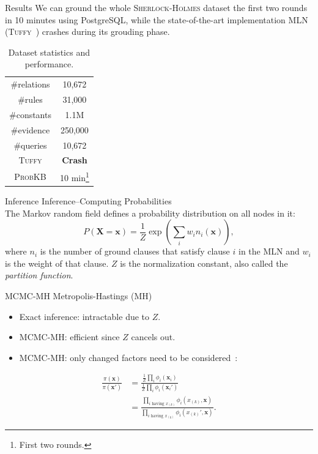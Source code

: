 \documentclass[onlymath,xcolor=pdftex,dvipsnames,table]{beamer}
\newcommand{\probkb}{\textsc{ProbKB}\xspace}
\newcommand{\sherlock}{\textsc{Sherlock}\xspace}
\newcommand{\holmes}{\textsc{Holmes}\xspace}
\newcommand{\tuffy}{\textsc{Tuffy}\xspace}
\let\oldemph\emph
\renewcommand{\emph}[1]{{\color{Blue}\oldemph{#1}}}
\newcommand{\head}[1]{{\large\color{OliveGreen}#1\\[2pt]}}
\begin{document}
\begin{frame}{Results}
We can ground the whole \sherlock-\holmes dataset the first two rounds in 10 minutes using PostgreSQL, while the state-of-the-art implementation MLN (\tuffy~\cite{DBLP:journals/pvldb/NiuRDS11}) crashes during its grouding phase.
\begin{table}
  \centering
  \begin{tabular}{|c|c|}\hline
   \#relations & 10,672 \\
   \#rules     & 31,000 \\
   \#constants & 1.1M \\
   \#evidence  & 250,000 \\
   \#queries   & 10,672 \\
   \tuffy      & \textbf{\color{Red}Crash} \\
   \probkb     & 10 min\footnote{First two rounds.} \\
   \hline
  \end{tabular}
  \caption{Dataset statistics and performance.}
\end{table}
\end{frame}

\begin{frame}{Inference}
\head{Inference--Computing Probabilities}
The Markov random field defines a probability distribution on all nodes in it:
$$P(\mathbf{X}=\mathbf{x})=\frac{1}{Z}\exp\left(\sum_iw_in_i(\mathbf{x})\right),$$
where $n_i$ is the number of ground clauses that satisfy clause $i$ in the MLN and $w_i$ is the weight of that clause. $Z$ is the normalization constant, also called the \emph{partition function}.
\end{frame}


\begin{frame}{MCMC-MH}
\head{Metropolis-Hastings (MH)}
\begin{itemize}
  \item Exact inference: intractable due to $Z$.
  \item MCMC-MH: efficient since $Z$ cancels out.
  \item MCMC-MH: only changed factors need to be considered~\cite{wick2010scalable}:
\end{itemize}
\begin{align}
\frac{\pi(\mathbf{x})}{\pi(\mathbf{x'})}&=\frac{\frac{1}{Z}\prod_i\phi_i(\mathbf{x}_i)}{\frac{1}{Z}\prod_i\phi_i(\mathbf{x}_i')}\nonumber\\
&=\frac{\prod_{i\text{ having }x_{(k)}}\phi_i(x_{(k)},\mathbf{x})}{\prod_{i\text{ having }x_{(k)}}\phi_i(x_{(k)}',\mathbf{x})}.\nonumber
\end{align}
\end{frame}
\end{document}

